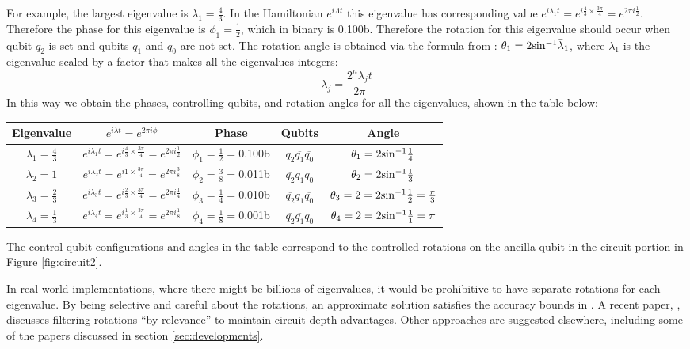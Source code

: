 \documentclass[12pt]{extarticle}
\begin{document}
For example, the largest eigenvalue is $\lambda_1=\frac{4}{3}$.
In the Hamiltonian $e^{i\Lambda t}$ this eigenvalue has corresponding value $e^{i\lambda_1t}=e^{i\frac{4}{3}\times\frac{3\pi}{4}}=e^{2\pi i \frac{1}{2}}$.
Therefore the phase for this eigenvalue is $\phi_1=\frac{1}{2}$, which in binary is 0.100b.
Therefore the rotation for this eigenvalue should occur when qubit $q_2$ is set and qubits $q_1$ and $q_0$ are not set.
The rotation angle is obtained via the formula from \cite{zaman2023step}: $\theta_1=2{{\sin}^{-1}}\bar{\lambda}_1$,
where $\bar{\lambda}_1$ is the eigenvalue scaled by a factor that makes all the eigenvalues integers:
\[
\bar{\lambda_j}=\frac{2^n\lambda_jt}{2\pi}
\]
In this way we obtain the phases, controlling qubits, and rotation angles for all the eigenvalues, shown in the table below:
\begin{center}
\begin{tabular}{|c|c|c|c|c|}
\hline
Eigenvalue & $e^{i\lambda t}=e^{2\pi i\phi}$ & Phase & Qubits & Angle \\
\hline
$\lambda_1=\frac{4}{3}$ & $e^{i\lambda_1t}=e^{i \frac{4}{3} \times \frac{3\pi}{4}}=e^{2\pi i \frac{1}{2}}$ & $\phi_1=\frac{1}{2}=$0.100b & $q_2\overline{q_1}\overline{q_0}$ & $\theta_1=2{{\sin}^{-1}}\frac{1}{4}$ \\
$\lambda_2=1$           & $e^{i\lambda_2t}=e^{i 1 \times \frac{3\pi}{4}}=e^{2\pi i \frac{3}{8}}$   & $\phi_2=\frac{3}{8}=$0.011b & $\overline{q_2}q_1q_0$ & $\theta_2=2{{\sin}^{-1}}\frac{1}{3}$ \\
$\lambda_3=\frac{2}{3}$ & $e^{i\lambda_3t}=e^{i \frac{2}{3} \times \frac{3\pi}{4}}=e^{2\pi i \frac{1}{4}}$ & $\phi_3=\frac{1}{4}=$0.010b & $\overline{q_2}q_1\overline{q_0}$ & $\theta_3=2=2{{\sin}^{-1}}\frac{1}{2}=\frac{\pi}{3}$ \\
$\lambda_4=\frac{1}{3}$ & $e^{i\lambda_4t}=e^{i \frac{1}{3} \times \frac{3\pi}{4}}=e^{2\pi i \frac{1}{8}}$ & $\phi_4=\frac{1}{8}=$0.001b & $\overline{q_2}\overline{q_1}q_0$ & $\theta_4=2=2{{\sin}^{-1}}\frac{1}{1}=\pi$ \\
\hline
\end{tabular}
\end{center}
The control qubit configurations and angles in the table correspond to the controlled rotations on the ancilla qubit in the circuit portion in Figure \ref{fig:circuit2}.

In real world implementations, where there might be billions of eigenvalues, it would be prohibitive to have separate rotations for each eigenvalue.
By being selective and careful about the rotations, an approximate solution satisfies the accuracy bounds in \cite{hhl2009}.
A recent paper, \cite{morgan2024enhanced}, discusses filtering rotations ``by relevance'' to maintain circuit depth advantages.
Other approaches are suggested elsewhere, including some of the papers discussed in section \ref{sec:developments}.
\end{document}

